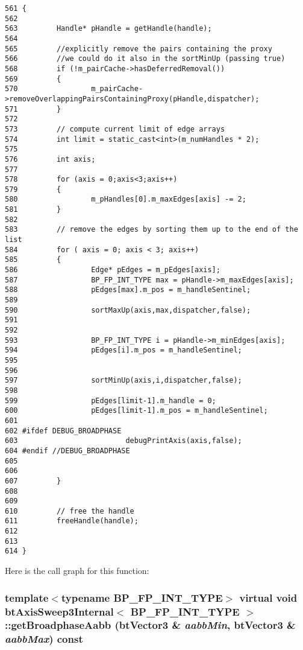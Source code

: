 \begin{Code}\begin{verbatim}561 {
562 
563         Handle* pHandle = getHandle(handle);
564 
565         //explicitly remove the pairs containing the proxy
566         //we could do it also in the sortMinUp (passing true)
568         if (!m_pairCache->hasDeferredRemoval())
569         {
570                 m_pairCache->removeOverlappingPairsContainingProxy(pHandle,dispatcher);
571         }
572 
573         // compute current limit of edge arrays
574         int limit = static_cast<int>(m_numHandles * 2);
575         
576         int axis;
577 
578         for (axis = 0;axis<3;axis++)
579         {
580                 m_pHandles[0].m_maxEdges[axis] -= 2;
581         }
582 
583         // remove the edges by sorting them up to the end of the list
584         for ( axis = 0; axis < 3; axis++)
585         {
586                 Edge* pEdges = m_pEdges[axis];
587                 BP_FP_INT_TYPE max = pHandle->m_maxEdges[axis];
588                 pEdges[max].m_pos = m_handleSentinel;
589 
590                 sortMaxUp(axis,max,dispatcher,false);
591 
592 
593                 BP_FP_INT_TYPE i = pHandle->m_minEdges[axis];
594                 pEdges[i].m_pos = m_handleSentinel;
595 
596 
597                 sortMinUp(axis,i,dispatcher,false);
598 
599                 pEdges[limit-1].m_handle = 0;
600                 pEdges[limit-1].m_pos = m_handleSentinel;
601                 
602 #ifdef DEBUG_BROADPHASE
603                         debugPrintAxis(axis,false);
604 #endif //DEBUG_BROADPHASE
605 
606 
607         }
608 
609 
610         // free the handle
611         freeHandle(handle);
612 
613         
614 }
\end{verbatim}
\end{Code}




Here is the call graph for this function:\hypertarget{classbt_axis_sweep3_internal_5f343e29ce818d0b96cb11260bca2a68}{
\subsubsection[getBroadphaseAabb]{\setlength{\rightskip}{0pt plus 5cm}template$<$typename BP\_\-FP\_\-INT\_\-TYPE$>$ virtual void {\bf btAxisSweep3Internal}$<$ BP\_\-FP\_\-INT\_\-TYPE $>$::getBroadphaseAabb (btVector3 \& {\em aabbMin}, \/  btVector3 \& {\em aabbMax}) const}}
\label{classbt_axis_sweep3_internal_5f343e29ce818d0b96cb11260bca2a68}


